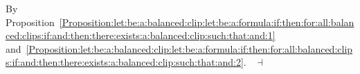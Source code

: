 \documentclass[draft]{article}
\newenvironment{proof}{{\bf Proof:}}{~$\dashv$\\}
\def\L{\mathbf{L}}
\begin{document}
\begin{proof}
%
%
%
%
%
%
%
By Proposition~\ref{Proposition:let:be:a:balanced:clip:let:be:a:formula:if:then:for:all:balanced:clips:if:and:then:there:exists:a:balanced:clip:such:that:and:1} and~\ref{Proposition:let:be:a:balanced:clip:let:be:a:formula:if:then:for:all:balanced:clips:if:and:then:there:exists:a:balanced:clip:such:that:and:2}.
%
%
%
%
%
%
%
%
%
%
%
%
\medskip
%
%
\end{proof}
\end{document}
